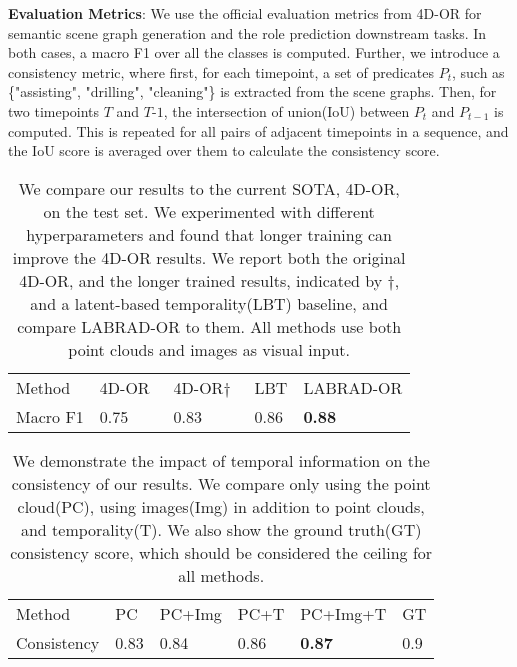 \documentclass[runningheads]{llncs}
\begin{document}
\noindent \textbf{Evaluation Metrics}: We use the official evaluation metrics from 4D-OR for semantic scene graph generation and the role prediction downstream tasks. In both cases, a macro F1 over all the classes is computed. Further, we introduce a consistency metric, where first, for each timepoint, a set of predicates $P_t$, such as \{"assisting", "drilling", "cleaning"\} is extracted from the scene graphs. Then, for two timepoints $T$ and $T$-$1$, the intersection of union(IoU) between $P_t$ and $P_{t-1}$ is computed. This is repeated for all pairs of adjacent timepoints in a sequence, and the IoU score is averaged over them to calculate the consistency score. 

\begin{table}[t]
    \centering
    \caption{We compare our results to the current SOTA, 4D-OR, on the test set. We experimented with different hyperparameters and found that longer training can improve the 4D-OR results. We report both the original 4D-OR, and the longer trained results, indicated by $\dagger$, and a latent-based temporality(LBT) baseline, and compare LABRAD-OR to them. All methods use both point clouds and images as visual input.}
    \begin{tabu} to 0.9\textwidth { X[c] | X[c] X[c] X[c] X[c]}
    \toprule
     Method & 4D-OR~\cite{ozsoy20224d} & 4D-OR$\dagger$~\cite{ozsoy20224d} & LBT & LABRAD-OR \\ 
        \cmidrule(){1-5}
		 Macro F1 & 0.75 & 0.83 & 0.86 & \textbf{0.88}  \\
   \bottomrule
   \end{tabu}
    \label{tab:sota_comparison}
\end{table}

\begin{table}[t]
    \centering
    \caption{We demonstrate the impact of temporal information on the consistency of our results. We compare only using the point cloud(PC), using images(Img) in addition to point clouds, and temporality(T). We also show the ground truth(GT) consistency score, which should be considered the ceiling for all methods.}
    \begin{tabu} to 0.95\textwidth { X[c] | X[c] X[c] X[c] X[c] | X[c]}
    \toprule
     Method & PC & PC+Img & PC+T & PC+Img+T & GT \\ 
        \cmidrule(){1-6}
		 Consistency & 0.83 & 0.84 & 0.86 & \textbf{0.87} & 0.9 \\
    \bottomrule
   \end{tabu}
    \label{tab:consistency_comparison}
\end{table}
\end{document}
